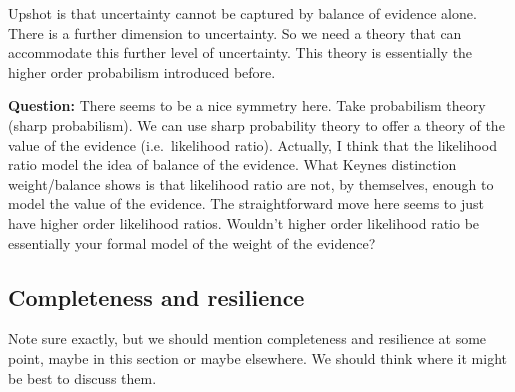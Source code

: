 \documentclass[
  10pt,
  dvipsnames,enabledeprecatedfontcommands]{scrartcl}
\begin{document}
Upshot is that uncertainty cannot be captured by balance of evidence
alone. There is a further dimension to uncertainty. So we need a theory
that can accommodate this further level of uncertainty. This theory is
essentially the higher order probabilism introduced before.

\textbf{Question:} There seems to be a nice symmetry here. Take
probabilism theory (sharp probabilism). We can use sharp probability
theory to offer a theory of the value of the evidence (i.e.~likelihood
ratio). Actually, I think that the likelihood ratio model the idea of
balance of the evidence. What Keynes distinction weight/balance shows is
that likelihood ratio are not, by themselves, enough to model the value
of the evidence. The straightforward move here seems to just have higher
order likelihood ratios. Wouldn't higher order likelihood ratio be
essentially your formal model of the weight of the evidence?

\hypertarget{completeness-and-resilience}{%
\subsection{Completeness and
resilience}\label{completeness-and-resilience}}

Note sure exactly, but we should mention completeness and resilience at
some point, maybe in this section or maybe elsewhere. We should think
where it might be best to discuss them.
\end{document}
